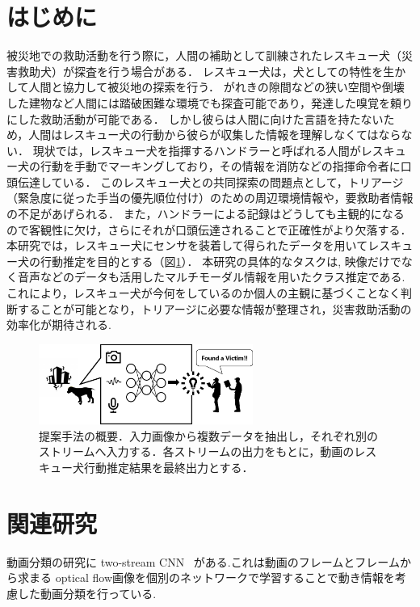 \documentclass[MIRU,submit]{miru2019j}
\begin{document}
\section{はじめに}
被災地での救助活動を行う際に，人間の補助として訓練されたレスキュー犬（災害救助犬）が探査を行う場合がある．
レスキュー犬は，犬としての特性を生かして人間と協力して被災地の探索を行う．
がれきの隙間などの狭い空間や倒壊した建物など人間には踏破困難な環境でも探査可能であり，発達した嗅覚を頼りにした救助活動が可能である．
しかし彼らは人間に向けた言語を持たないため，人間はレスキュー犬の行動から彼らが収集した情報を理解しなくてはならない．
現状では，レスキュー犬を指揮するハンドラーと呼ばれる人間がレスキュー犬の行動を手動でマーキングしており，その情報を消防などの指揮命令者に口頭伝達している．
このレスキュー犬との共同探索の問題点として，トリアージ（緊急度に従った手当の優先順位付け）のための周辺環境情報や，要救助者情報の不足があげられる．
また，ハンドラーによる記録はどうしても主観的になるので客観性に欠け，さらにそれが口頭伝達されることで正確性がより欠落する．
本研究では，レスキュー犬にセンサを装着して得られたデータを用いてレスキュー犬の行動推定を目的とする（図\ref{lite_model}）．
本研究の具体的なタスクは, 映像だけでなく音声などのデータも活用したマルチモーダル情報を用いたクラス推定である.これにより，レスキュー犬が今何をしているのか個人の主観に基づくことなく判断することが可能となり，トリアージに必要な情報が整理され，災害救助活動の効率化が期待される.

\begin{figure}[tb]
 \begin{center}
  \includegraphics[width=7cm]{./Figures/dogactrec.eps}
  \caption{提案手法の概要．入力画像から複数データを抽出し，それぞれ別のストリームへ入力する．各ストリームの出力をもとに，動画のレスキュー犬行動推定結果を最終出力とする．}
  \label{lite_model}
 \end{center}
\end{figure}

\section{関連研究}
動画分類の研究に two-stream CNN ~\cite{simonyan2014two}がある.これは動画のフレームとフレームから求まる optical flow画像を個別のネットワークで学習することで動き情報を考慮した動画分類を行っている.
\end{document}
